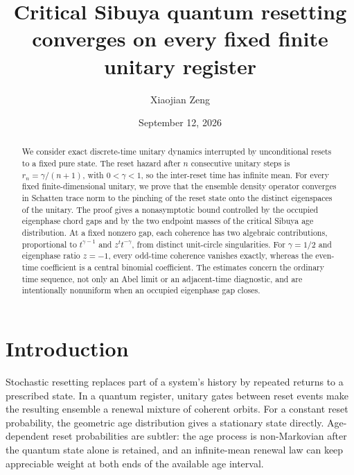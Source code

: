 \documentclass[aps,pra,reprint,superscriptaddress,longbibliography,nofootinbib]{revtex4-2}
\begin{document}
\title{Critical Sibuya quantum resetting converges on every fixed finite unitary register}

\author{Xiaojian Zeng}

\date{September 12, 2026}

\begin{abstract}
We consider exact discrete-time unitary dynamics interrupted by unconditional
resets to a fixed pure state.  The reset hazard after $n$ consecutive unitary
steps is $r_n=\gamma/(n+1)$, with $0<\gamma<1$, so the inter-reset time has
infinite mean.  For every fixed finite-dimensional unitary, we prove that the
ensemble density operator converges in Schatten trace norm to the pinching of
the reset state onto the distinct eigenspaces of the unitary.  The proof gives
a nonasymptotic bound controlled by the occupied eigenphase chord gaps and by
the two endpoint masses of the critical Sibuya age distribution.  At a fixed
nonzero gap, each coherence has two algebraic contributions, proportional to
$t^{\gamma-1}$ and $z^t t^{-\gamma}$, from distinct unit-circle singularities.
For $\gamma=1/2$ and eigenphase ratio $z=-1$, every odd-time coherence vanishes
exactly, whereas the even-time coefficient is a central binomial coefficient.
The estimates concern the ordinary time sequence, not only an Abel limit or
an adjacent-time diagnostic, and are intentionally nonuniform when an occupied
eigenphase gap closes.
\end{abstract}

\maketitle

\section{Introduction}

Stochastic resetting replaces part of a system's history by repeated returns
to a prescribed state.  In a quantum register, unitary gates between reset
events make the resulting ensemble a renewal mixture of coherent orbits.
For a constant reset probability, the geometric age distribution gives a
stationary state directly.  Age-dependent reset probabilities are subtler:
the age process is non-Markovian after the quantum state alone is retained,
and an infinite-mean renewal law can keep appreciable weight at both ends of
the available age interval.
\end{document}
